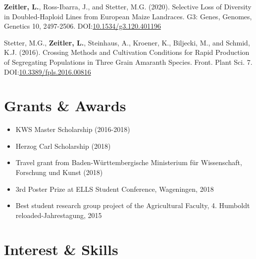 \documentclass[margin,10pt,a4paper]{res}
\begin{document}
\begin{resume}
\begin{etaremune}
\item \textbf{Zeitler, L.}, Ross-Ibarra, J., and Stetter, M.G. (2020). Selective Loss of Diversity in Doubled-Haploid Lines from European Maize Landraces. G3: Genes, Genomes, Genetics 10, 2497-2506. DOI:\href{https://doi.org/10.1534/g3.120.401196}{10.1534/g3.120.401196}

\item Stetter, M.G., \textbf{Zeitler, L.}, Steinhaus, A., Kroener, K., Biljecki, M., and Schmid, K.J. (2016). Crossing Methods and Cultivation Conditions for Rapid Production of Segregating Populations in Three Grain Amaranth Species. Front. Plant Sci. 7. DOI:\href{https://doi.org/10.3389/fpls.2016.00816}{10.3389/fpls.2016.00816}
  
\end{etaremune}



\section{Grants \& Awards} 
\begin{itemize}\itemsep -2pt %
\item KWS Master Scholarship (2016-2018)
\item Herzog Carl Scholarship (2018)
\item Travel grant from Baden-Württembergische Ministerium für Wissenschaft, Forschung und Kunst (2018)
\item 3rd Poster Prize at ELLS Student Conference, Wageningen, 2018
\item Best student research group project of the Agricultural Faculty, 4. Humboldt reloaded-Jahrestagung, 2015
\end{itemize}



\section{Interest \& Skills } 


\end{resume}
\end{document}

